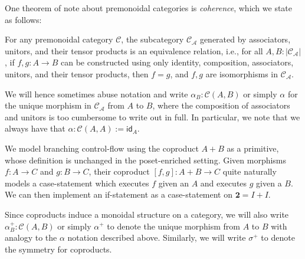 \documentclass[acmsmall,screen,review]{acmart}
\newcommand{\mc}[1]{\ensuremath{\mathcal{#1}}}
\newcommand{\mb}[1]{\ensuremath{\mathbf{#1}}}
\newcommand{\ms}[1]{\ensuremath{\mathsf{#1}}}
\begin{document}
One theorem of note about premonoidal categories is \emph{coherence}, which we state as follows:
\begin{theorem}
  For any premonoidal category $\mc{C}$, the subcategory $\mc{C}_\mc{A}$ generated by associators,
  unitors, and their tensor products is an equivalence relation, i.e., for all $A, B :
  |\mc{C}_\mc{A}|$, if $f, g : A \to B$ can be constructed using only identity, composition,
  associators, unitors, and their tensor products, then $f = g$, and $f, g$ are isomorphisms in
  $\mc{C}_\mc{A}$.
  \label{thm:monoidal-coherence}
\end{theorem}
We will hence sometimes abuse notation and write $\alpha_B : \mc{C}(A, B)$ or simply $\alpha$ for
the unique morphism in $\mc{C}_\mc{A}$ from $A$ to $B$, where the composition of associators and
unitors is too cumbersome to write out in full. In particular, we note that we always have that
$\alpha: \mc{C}(A, A) := \ms{id}_A$.

We model branching control-flow using the coproduct $A + B$ as a primitive, whose definition is
unchanged in the poset-enriched setting. Given morphisms $f : A \to C$ and $g : B \to C$, their
coproduct $[f, g] : A + B \to C$ quite naturally models a case-statement which executes $f$ given an
$A$ and executes $g$ given a $B$. We can then implement an if-statement as a case-statement on
$\mb{2} = I + I$.

Since coproducts induce a monoidal structure on a category, we will also write $\alpha^+_B :
\mc{C}(A, B)$ or simply $\alpha^+$ to denote the unique morphism from $A$ to $B$ with analogy to the
$\alpha$ notation described above. Similarly, we will write $\sigma^+$ to denote the symmetry for
coproducts.
\end{document}
